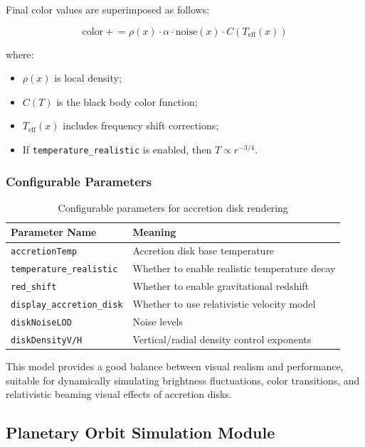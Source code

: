 \documentclass[11pt,a4paper]{article}
\begin{document}
Final color values are superimposed as follows:

\begin{equation}
\text{color} \mathrel{+}= \rho(x) \cdot \alpha \cdot \text{noise}(x) \cdot C(T_{\text{eff}}(x))
\end{equation}

where:

\begin{itemize}
    \item $\rho(x)$ is local density;
    \item $C(T)$ is the black body color function;
    \item $T_{\text{eff}}(x)$ includes frequency shift corrections;
    \item If \texttt{temperature\_realistic} is enabled, then $T \propto r^{-3/4}.$
\end{itemize}

\subsubsection{Configurable Parameters}

\begin{table}[H]
\centering
\begin{tabular}{@{}ll@{}}
\toprule
Parameter Name & Meaning \\
\midrule
\texttt{accretionTemp} & Accretion disk base temperature \\
\texttt{temperature\_realistic} & Whether to enable realistic temperature decay \\
\texttt{red\_shift} & Whether to enable gravitational redshift \\
\texttt{display\_accretion\_disk} & Whether to use relativistic velocity model \\
\texttt{diskNoiseLOD} & Noise levels \\
\texttt{diskDensityV/H} & Vertical/radial density control exponents \\
\bottomrule
\end{tabular}
\caption{Configurable parameters for accretion disk rendering}
\end{table}

This model provides a good balance between visual realism and performance, suitable for dynamically simulating brightness fluctuations, color transitions, and relativistic beaming visual effects of accretion disks.

\subsection{Planetary Orbit Simulation Module}
\end{document}
